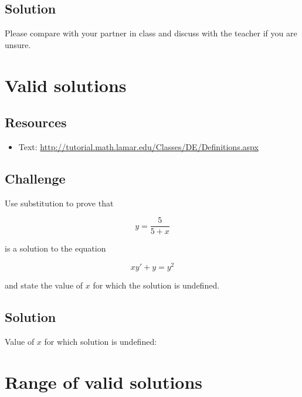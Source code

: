 \subsection*{Solution}
Please compare with your partner in class and discuss with the teacher if you are unsure.




\newpage

\section{Valid solutions}

\subsection*{Resources}
\begin{itemize}
    \item Text: \url{http://tutorial.math.lamar.edu/Classes/DE/Definitions.aspx}
\end{itemize}

\subsection*{Challenge}

Use substitution to prove that

\begin{equation}
    y=\frac{5}{5+x}
\end{equation}

is a solution to the equation

\begin{equation}
    x y'+y=y^2
\end{equation}

and state the value of $x$ for which the solution is undefined.

\subsection*{Solution}
Value of $x$ for which solution is undefined:





\newpage

\section{Range of valid solutions}

